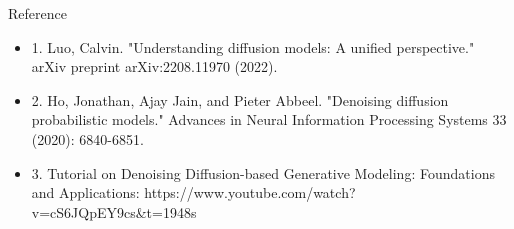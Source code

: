 \documentclass{beamer}
\begin{document}
\begin{frame}{Reference}
	\begin{itemize}
		\item 1. Luo, Calvin. "Understanding diffusion models: A unified perspective." arXiv preprint arXiv:2208.11970 (2022).
		\item 2. Ho, Jonathan, Ajay Jain, and Pieter Abbeel. "Denoising diffusion probabilistic models." Advances in Neural Information Processing Systems 33 (2020): 6840-6851.
		\item 3. Tutorial on Denoising Diffusion-based Generative Modeling: Foundations and Applications: https://www.youtube.com/watch?v=cS6JQpEY9cs\&t=1948s
	\end{itemize}

\end{frame}
\end{document}

